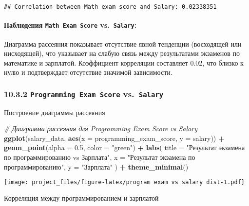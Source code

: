 \documentclass[
]{article}
\newenvironment{Shaded}{\begin{snugshade}}{\end{snugshade}}
\newcommand{\AttributeTok}[1]{\textcolor[rgb]{0.13,0.29,0.53}{#1}}
\newcommand{\CommentTok}[1]{\textcolor[rgb]{0.56,0.35,0.01}{\textit{#1}}}
\newcommand{\FloatTok}[1]{\textcolor[rgb]{0.00,0.00,0.81}{#1}}
\newcommand{\FunctionTok}[1]{\textcolor[rgb]{0.13,0.29,0.53}{\textbf{#1}}}
\newcommand{\NormalTok}[1]{#1}
\newcommand{\SpecialCharTok}[1]{\textcolor[rgb]{0.81,0.36,0.00}{\textbf{#1}}}
\newcommand{\StringTok}[1]{\textcolor[rgb]{0.31,0.60,0.02}{#1}}
\begin{document}
\begin{verbatim}
## Correlation between Math exam score and Salary: 0.02338351
\end{verbatim}

\paragraph{\texorpdfstring{Наблюдения \texttt{Math\ Exam\ Score}
vs.~\texttt{Salary}:}{Наблюдения Math Exam Score vs.~Salary:}}\label{ux43dux430ux431ux43bux44eux434ux435ux43dux438ux44f-math-exam-score-vs.-salary}

Диаграмма рассеяния показывает отсутствие явной тенденции (восходящей
или нисходящей), что указывает на слабую связь между результатами
экзаменов по математике и зарплатой. Коэффициент корреляции составляет
0.02, что близко к нулю и подтверждает отсутствие значимой зависимости.

\subsubsection{\texorpdfstring{10.3.2 \texttt{Programming\ Exam\ Score}
vs.~\texttt{Salary}}{10.3.2 Programming Exam Score vs.~Salary}}\label{programming-exam-score-vs.-salary}

Построение диаграммы рассеяния

\begin{Shaded}
\begin{Highlighting}[]
\CommentTok{\# Диаграмма рассеяния для Programming Exam Score vs Salary}
\FunctionTok{ggplot}\NormalTok{(salary\_data, }\FunctionTok{aes}\NormalTok{(}\AttributeTok{x =}\NormalTok{ programming\_exam\_score, }\AttributeTok{y =}\NormalTok{ salary)) }\SpecialCharTok{+}
  \FunctionTok{geom\_point}\NormalTok{(}\AttributeTok{alpha =} \FloatTok{0.5}\NormalTok{, }\AttributeTok{color =} \StringTok{"green"}\NormalTok{) }\SpecialCharTok{+}
  \FunctionTok{labs}\NormalTok{(}
    \AttributeTok{title =} \StringTok{"Результат экзамена по программированию vs Зарплата"}\NormalTok{,}
    \AttributeTok{x =} \StringTok{"Результат экзамена по программированию"}\NormalTok{,}
    \AttributeTok{y =} \StringTok{"Зарплата"}
\NormalTok{  ) }\SpecialCharTok{+}
  \FunctionTok{theme\_minimal}\NormalTok{()}
\end{Highlighting}
\end{Shaded}

\texttt{[image: project\_files/figure-latex/program exam vs salary dist-1.pdf]}

Корреляция между программированием и зарплатой
\end{document}
